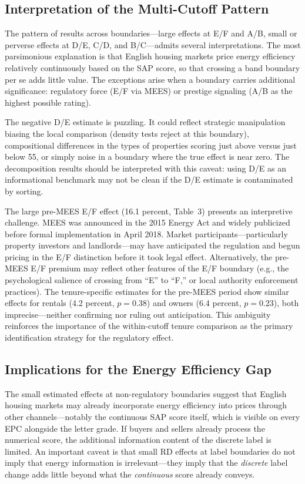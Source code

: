 \documentclass[12pt]{article}
\begin{document}
\subsection{Interpretation of the Multi-Cutoff Pattern}

The pattern of results across boundaries---large effects at E/F and A/B, small or perverse effects at D/E, C/D, and B/C---admits several interpretations. The most parsimonious explanation is that English housing markets price energy efficiency relatively continuously based on the SAP score, so that crossing a band boundary per se adds little value. The exceptions arise when a boundary carries additional significance: regulatory force (E/F via MEES) or prestige signaling (A/B as the highest possible rating).

The negative D/E estimate is puzzling. It could reflect strategic manipulation biasing the local comparison (density tests reject at this boundary), compositional differences in the types of properties scoring just above versus just below 55, or simply noise in a boundary where the true effect is near zero. The decomposition results should be interpreted with this caveat: using D/E as an informational benchmark may not be clean if the D/E estimate is contaminated by sorting.

The large pre-MEES E/F effect (16.1 percent, Table~3) presents an interpretive challenge. MEES was announced in the 2015 Energy Act and widely publicized before formal implementation in April 2018. Market participants---particularly property investors and landlords---may have anticipated the regulation and begun pricing in the E/F distinction before it took legal effect. Alternatively, the pre-MEES E/F premium may reflect other features of the E/F boundary (e.g., the psychological salience of crossing from ``E'' to ``F,'' or local authority enforcement practices). The tenure-specific estimates for the pre-MEES period show similar effects for rentals (4.2 percent, $p = 0.38$) and owners (6.4 percent, $p = 0.23$), both imprecise---neither confirming nor ruling out anticipation. This ambiguity reinforces the importance of the within-cutoff tenure comparison as the primary identification strategy for the regulatory effect.

\subsection{Implications for the Energy Efficiency Gap}

The small estimated effects at non-regulatory boundaries suggest that English housing markets may already incorporate energy efficiency into prices through other channels---notably the continuous SAP score itself, which is visible on every EPC alongside the letter grade. If buyers and sellers already process the numerical score, the additional information content of the discrete label is limited. An important caveat is that small RD effects at label boundaries do not imply that energy information is irrelevant---they imply that the \textit{discrete} label change adds little beyond what the \textit{continuous} score already conveys.
\end{document}
